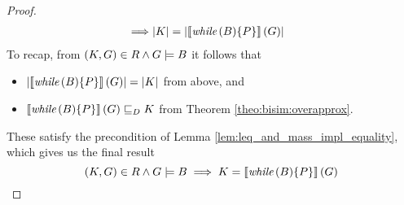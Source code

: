 \begin{theorem}[continues=theo:bisim:loopsmtx, label=proof:bisim:loopsmtx]
\begin{proof}
\begin{align*}
		\implies & |K| = \left| \left\llbracket \textit{while}\,(B) \{P\} \right\rrbracket(G) \right|
		\end{align*}
		To recap, from $\left( K, G \right) \in R \land G \models B$ it follows that
		\begin{itemize}
			\item $\left| \left\llbracket \textit{while}\,(B) \{P\} \right\rrbracket(G) \right| = |K|$ from above, and
			\item $\left\llbracket \textit{while}\,(B) \{P\} \right\rrbracket(G) \sqsubseteq_{D} K$ from Theorem \ref{theo:bisim:overapprox}.
		\end{itemize}
		These satisfy the precondition of Lemma \ref{lem:leq_and_mass_impl_equality},
		which gives us the final result
		\[ \left( K, G \right) \in R \land G \models B
			\implies K = \left\llbracket \textit{while}\,(B) \{P\} \right\rrbracket(G) 		\qedhere \]
	\end{proof}
\end{theorem}